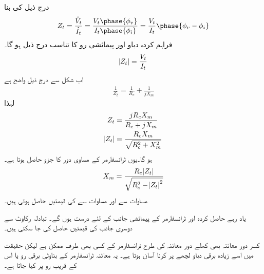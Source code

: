 درج ذیل کی بنا
\begin{align*}
Z_t=\frac{\hat{V}_t}{\hat{I}_t}=\frac{V_t\phase{\phi_v}}{I_t\phase{\phi_i}}=\frac{V_t}{I_t}\phase{\phi_v-\phi_i}
\end{align*}
فراہم کردہ دباو اور پیمائشی رو کا تناسب درج ذیل ہو گا۔
\begin{align*}
\abs{Z_t}=\frac{V_t}{I_t}
\end{align*}
اب شکل   سے درج ذیل  واضح ہے
\begin{align*}
\frac{1}{Z_t}=\frac{1}{R_c}+\frac{1}{j X_m}
\end{align*}
لہٰذا
\begin{align*}
Z_t&=\frac{j R_c X_m}{R_c+j X_m}\\
\abs{Z_t}&=\frac{R_c X_m}{\sqrt{R_c^2+X_m^2}}
\end{align*}
ہو گا۔یوں ٹرانسفارمر کے مساوی دور کا جزو  حاصل ہوتا ہے۔
\begin{align}\label{مساوات_ٹرانسفارمر_کھلے_دور_امالہ_حاصل}
X_m=\frac{R_c \abs{Z_t}}{\sqrt{R_c^2-\abs{Z_t}^2}}
\end{align}
مساوات   سے  اور  مساوات   سے    کی قیمتیں حاصل ہوتی ہیں۔

یاد رہے حاصل کردہ  اور  ٹرانسفارمر کے پیمائشی جانب کے لئے درست ہوں گے۔ تبادلہ رکاوٹ سے دوسری جانب کی قیمتیں حاصل کی جا سکتی ہیں۔ 

کسر دور معائنہ بھی کھلے دور معائنہ کی طرح ٹرانسفارمر کے کسی بھی طرف ممکن  ہے لیکن حقیقت میں اسے زیادہ برقی دباو لچھے پر کرنا  آسان ہوتا ہے۔ یہ معائنہ  ٹرانسفارمر کے بناوٹی برقی رو  یا اس کے قریب رو پر کیا جاتا ہے۔

